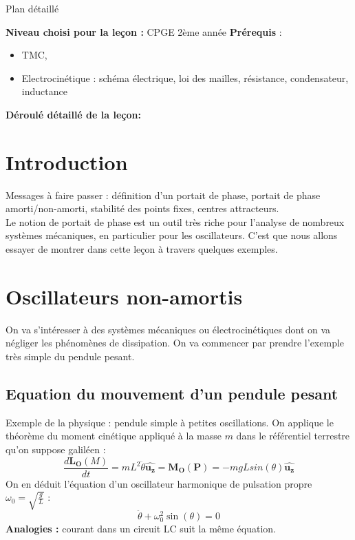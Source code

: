 \begin{reportBlock}{Plan détaillé}

  \textbf{Niveau choisi pour la leçon :} CPGE 2ème année
  \newline
  \textbf{Prérequis} : \begin{itemize}
      \item TMC,
      \item Electrocinétique : schéma électrique, loi des mailles, résistance, condensateur, inductance
  \end{itemize}

  \textbf{Déroulé détaillé de la leçon: }  
  
  \section*{Introduction}
Messages à faire passer : définition d'un portait de phase, portait de phase amorti/non-amorti, stabilité des points fixes, centres attracteurs.\\

Le notion de portait de phase est un outil très riche pour l'analyse de nombreux systèmes mécaniques, en particulier pour les oscillateurs. C'est que nous allons essayer de montrer dans cette leçon à travers quelques exemples.

  \section{Oscillateurs non-amortis}
  On va s'intéresser à des systèmes mécaniques ou électrocinétiques dont on va négliger les phénomènes de dissipation. On va commencer par prendre l'exemple très simple du pendule pesant.
  \subsection{Equation du mouvement d'un pendule pesant}
  Exemple de la physique : pendule simple à petites oscillations. On applique le théorème du moment cinétique appliqué à la masse $m$ dans le référentiel terrestre qu'on suppose galiléen :
  \begin{equation}
     \frac{d\mathbf{L_O}(M)}{dt} = mL^2\ddot{\theta}\mathbf{\hat{u_z}} = \mathbf{M_O}(\mathbf{P}) = -mgLsin(\theta)\mathbf{\hat{u_z}}
  \end{equation}
  On en déduit l'équation d'un oscillateur harmonique de pulsation propre $\omega_0=\sqrt{\frac{g}{L}}$ :
  \begin{equation}
      \ddot{\theta} + \omega_0^2\sin(\theta) = 0
  \end{equation}
  \textbf{Analogies :} courant dans un circuit LC suit la même équation.

\end{reportBlock}
